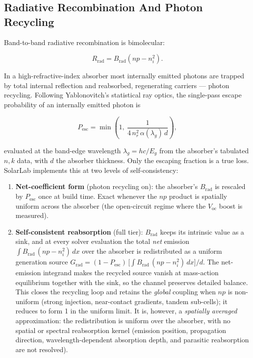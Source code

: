 \documentclass[
  11pt,
  american,
]{report}
\providecommand{\tightlist}{%
  \setlength{\itemsep}{0pt}\setlength{\parskip}{0pt}}
\begin{document}
\hypertarget{radiative-recombination-and-photon-recycling}{%
\subsection{Radiative Recombination And Photon
Recycling}\label{radiative-recombination-and-photon-recycling}}

Band-to-band radiative recombination is bimolecular:

\begin{equation}
\label{eq:radiative}
R_\mathrm{rad}=B_\mathrm{rad}(np-n_i^2).
\end{equation}

In a high-refractive-index absorber most internally emitted photons are
trapped by total internal reflection and reabsorbed, regenerating
carriers --- photon recycling. Following Yablonovitch's statistical ray
optics, the single-pass escape probability of an internally emitted
photon is

\begin{equation}
\label{eq:p-esc}
P_\mathrm{esc}
=
\min\!\left(1,\ \frac{1}{4\, n_r^2\, \alpha(\lambda_g)\, d}\right),
\end{equation}

evaluated at the band-edge wavelength \(\lambda_g = hc/E_g\) from the
absorber's tabulated \(n,k\) data, with \(d\) the absorber thickness.
Only the escaping fraction is a true loss. SolarLab implements this at
two levels of self-consistency:

\begin{enumerate}
\def\labelenumi{\arabic{enumi}.}
\tightlist
\item
  \textbf{Net-coefficient form} (photon recycling on): the absorber's
  \(B_\mathrm{rad}\) is rescaled by \(P_\mathrm{esc}\) once at build
  time. Exact whenever the \(np\) product is spatially uniform across
  the absorber (the open-circuit regime where the \(V_\mathrm{oc}\)
  boost is measured).
\item
  \textbf{Self-consistent reabsorption} (full tier): \(B_\mathrm{rad}\)
  keeps its intrinsic value as a sink, and at every solver evaluation
  the total \emph{net} emission
  \(\int B_\mathrm{rad}\,(np - n_i^2)\, dx\) over the absorber is
  redistributed as a uniform generation source
  \(G_\mathrm{rad} = (1-P_\mathrm{esc})\, \big[\textstyle\int B_\mathrm{rad}\,(np-n_i^2)\, dx\big]/d\).
  The net-emission integrand makes the recycled source vanish at
  mass-action equilibrium together with the sink, so the channel
  preserves detailed balance. This closes the recycling loop and retains
  the \emph{global} coupling when \(np\) is non-uniform (strong
  injection, near-contact gradients, tandem sub-cells); it reduces to
  form 1 in the uniform limit. It is, however, a \emph{spatially
  averaged} approximation: the redistribution is uniform over the
  absorber, with no spatial or spectral reabsorption kernel (emission
  position, propagation direction, wavelength-dependent absorption
  depth, and parasitic reabsorption are not resolved).
\end{enumerate}
\end{document}
